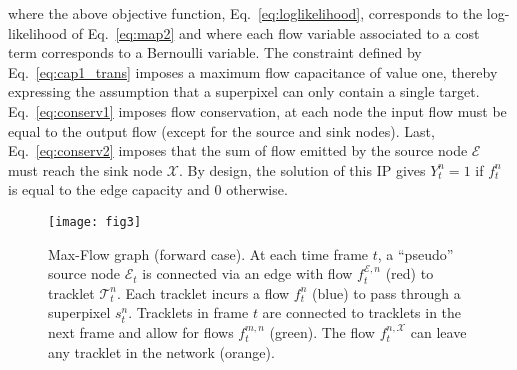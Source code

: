 \noindent
where the above objective function, Eq.~\eqref{eq:loglikelihood}, corresponds to the log-likelihood of Eq.~\eqref{eq:map2} and where each flow variable associated to a cost term corresponds to a Bernoulli variable. The constraint defined by Eq.~\eqref{eq:cap1_trans} imposes a maximum flow capacitance of value one, thereby expressing the assumption that a superpixel can only contain a single target. Eq.~\eqref{eq:conserv1} imposes flow conservation, \ie at each node the input flow must be equal to the output flow (except for the source and sink nodes). Last, Eq.~\eqref{eq:conserv2} imposes that the sum of flow emitted by the source node $\mathcal{E}$ must reach the sink node $\mathcal{X}$. By design, the solution of this IP gives $Y_t^n=1$ if $f_t^n$ is equal to the edge capacity and 0 otherwise.
\begin{figure}[t]
\centering
\texttt{[image: fig3]}
\caption{Max-Flow graph (forward case). At each time frame $t$, a ``pseudo'' source node $\mathcal{E}_t$ is connected via an edge with flow $f_{t}^{\mathcal{E},n}$ (red) to tracklet $\mathcal{T}_t^n$. Each tracklet incurs a flow $f_t^n$ (blue) to pass through a superpixel $s_t^n$. Tracklets in frame $t$ are connected to tracklets in the next frame and allow for flows $f_{t}^{m,n}$ (green). The flow $f_{t}^{n,\mathcal{X}}$ can leave any tracklet in the network (orange).}
\label{fig:mcf}
\end{figure}

